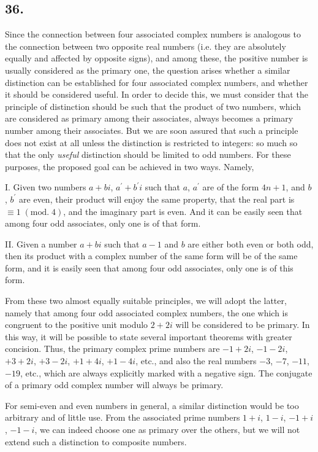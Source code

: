 \documentclass[twoside,12pt]{memoir}
\renewcommand{\pmod}[1]{\;(\textrm{mod.}\;#1)}
\begin{document}
\subsection*{36.}
 
Since the connection between four associated complex numbers is analogous to the connection between two opposite real numbers (i{.}e{.} they are absolutely equally and affected by opposite signs), and among these, the positive number is usually considered as the primary one, the question arises whether a similar distinction can be established for four associated complex numbers, and whether it should be considered useful. In order to decide this, we must consider that the principle of distinction should be such that the product of two numbers, which are considered as primary among their associates, always becomes a primary number among their associates. But we are soon assured that such a principle does not exist at all unless the distinction is restricted to integers: so much so that the only \textit{useful} distinction should be limited to odd numbers. For these purposes, the proposed goal can be achieved in two ways. Namely,
 
I. Given two numbers \(a+b i\), \(a^{\prime}+b^{\prime} i\) such that \(a\), \(a^{\prime}\) are of the form \(4 n+1\), and \(b\), \(b^{\prime}\) are even, their product will enjoy the same property, that the real part is \(\equiv 1\pmod{4}\), and the imaginary part is even. And it can be easily seen that among four odd associates, only one is of that form.
 
II. Given a number \(a+b i\) such that \(a-1\) and \(b\) are either both even or both odd, then its product with a complex number of the same form will be of the same form, and it is easily seen that among four odd associates, only one is of this form.
%

From these two almost equally suitable principles, we will adopt the latter, namely that among four odd associated complex numbers, the one which is congruent to the positive unit modulo \(2+2i\) will be considered to be primary. In this way, it will be possible to state several important theorems with greater concision. Thus, the primary complex prime numbers are \(-1+2i\), \(-1-2i\), \(+3+2i\), \(+3-2i\), \(+1+4i\), \(+1-4i\), etc., and also the real numbers \(-3\), \(-7\), \(-11\), \(-19\), etc., which are always explicitly marked with a negative sign. The conjugate of a primary odd complex number will always be primary.

For semi-even and even numbers in general, a similar distinction would be too arbitrary and of little use. From the associated prime numbers \(1+i\), \(1-i\), \(-1+i\), \(-1-i\), we can indeed choose one as primary over the others, but we will not extend such a distinction to composite numbers.
%
\end{document}

